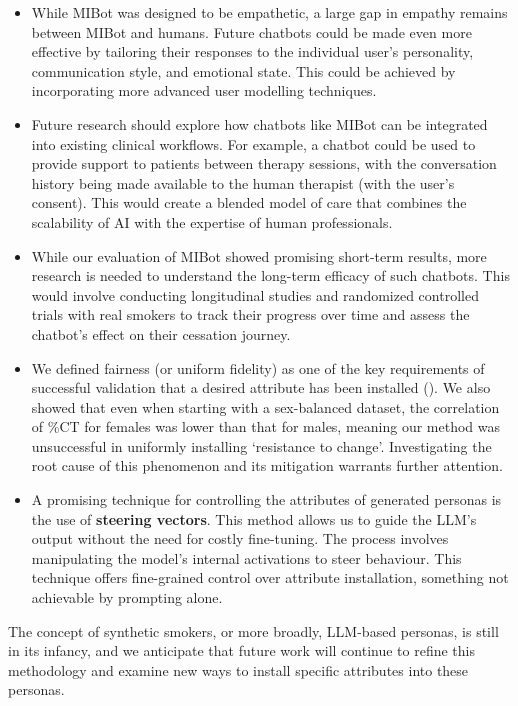 \begin{itemize}
    \item While MIBot was designed to be empathetic, a large gap in empathy remains between MIBot and humans. Future chatbots could be made even more effective by tailoring their responses to the individual user's personality, communication style, and emotional state. This could be achieved by incorporating more advanced user modelling techniques.
    \item Future research should explore how chatbots like MIBot can be integrated into existing clinical workflows. For example, a chatbot could be used to provide support to patients between therapy sessions, with the conversation history being made available to the human therapist (with the user's consent). This would create a blended model of care that combines the scalability of AI with the expertise of human professionals.
    \item While our evaluation of MIBot showed promising short-term results, more research is needed to understand the long-term efficacy of such chatbots. This would involve conducting longitudinal studies and randomized controlled trials with real smokers to track their progress over time and assess the chatbot's effect on their cessation journey.
    \item  We defined fairness (or uniform fidelity) as one of the key requirements of successful validation that a desired attribute has been installed (). We also showed that even when starting with a sex-balanced dataset, the correlation of \%CT for females was lower than that for males, meaning our method was unsuccessful in uniformly installing `resistance to change'. Investigating the root cause of this phenomenon and its mitigation warrants further attention.
    \item A promising technique for controlling the attributes of generated personas is the use of \textbf{steering vectors}. This method allows us to guide the LLM's output without the need for costly fine-tuning. The process involves manipulating the model's internal activations to steer behaviour. This technique offers fine-grained control over attribute installation, something not achievable by prompting alone.
\end{itemize}

The concept of synthetic smokers, or more broadly, LLM-based personas, is still in its infancy, and we anticipate that future work will continue to refine this methodology and examine new ways to install specific attributes into these personas.

